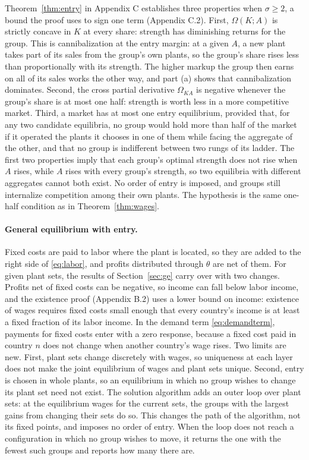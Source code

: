\documentclass[11pt]{article}
\begin{document}
Theorem~\ref{thm:entry} in Appendix C establishes three properties when $\sigma\ge2$, a
bound the proof uses to sign one term (Appendix C.2).
First, $\Omega(K;A)$ is strictly concave in $K$ at every share: strength has
diminishing returns for the group. This is cannibalization at the entry margin: at a
given $A$, a new plant takes part of its sales from the group's own plants, so the
group's share rises less than proportionally with its strength. The higher markup the
group then earns on all of its sales works the other way, and part (a) shows that
cannibalization dominates. Second, the cross partial derivative $\Omega_{KA}$ is
negative whenever the group's share is at most one half: strength is worth less in a
more competitive market. Third, a market has at most one entry equilibrium, provided
that, for any two candidate equilibria, no group would hold more than half of the
market if it operated the plants it chooses in one of them while facing the aggregate
of the other, and that no group is indifferent between two rungs of its ladder. The
first two properties imply that each group's optimal strength does not rise when $A$
rises, while $A$ rises with every group's strength, so two equilibria with different
aggregates cannot both exist. No order of entry is imposed, and groups still
internalize competition among their own plants. The hypothesis is the same one-half
condition as in Theorem~\ref{thm:wages}.

\paragraph{General equilibrium with entry.} Fixed costs are paid to labor where the
plant is located, so they are added to the right side of \eqref{eq:labor}, and profits
distributed through $\theta$ are net of them. For given plant sets, the results of
Section~\ref{sec:ge} carry over with two changes. Profits net of fixed costs can be
negative, so income can fall below labor income, and the existence proof (Appendix B.2)
uses a lower bound on income: existence of wages requires fixed costs small enough that
every country's income is at least a fixed fraction of its labor income. In the demand term \eqref{eq:demandterm}, payments for fixed costs enter
with a zero response, because a fixed cost paid in country $n$ does not change when
another country's wage rises. Two limits are new. First, plant sets change discretely
with wages, so uniqueness at each layer does not make the joint equilibrium of wages
and plant sets unique. Second, entry is chosen in whole plants, so an equilibrium in
which no group wishes to change its plant set need not exist. The solution algorithm
adds an outer loop over plant sets: at the equilibrium wages for the current sets, the
groups with the largest gains from changing their sets do so. This changes the path of
the algorithm, not its fixed points, and imposes no order of entry. When the loop does
not reach a configuration in which no group wishes to move, it returns the one with
the fewest such groups and reports how many there are.
\end{document}
